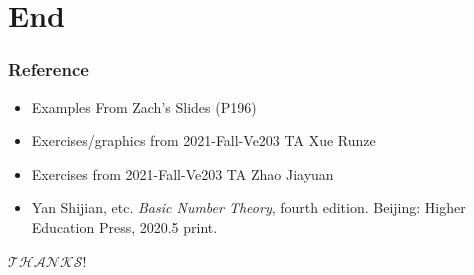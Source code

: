 \documentclass{beamer}
\begin{document}
\section{End}
\begin{frame}
    \frametitle{Reference}

    \begin{itemize}
        \item Examples From Zach's Slides (P196)
        \item Exercises/graphics from 2021-Fall-Ve203 TA Xue Runze
        \item Exercises from 2021-Fall-Ve203 TA Zhao Jiayuan
        \item Yan Shijian, etc. \textit{Basic Number Theory},
        fourth edition. Beijing: Higher Education Press, 2020.5 print.
    \end{itemize}

\end{frame}
\begin{frame}
    \centering
    \Huge{$\mathcal{THANKS}$!}
\end{frame}
\end{document}
